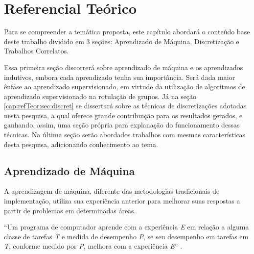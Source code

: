 \chapter{Referencial Teórico}\label{cap:refTeor}


Para se compreender a temática proposta, este capítulo abordará o conteúdo base deste trabalho dividido em 3 seções: Aprendizado de Máquina, Discretização e Trabalhos Correlatos. 

Essa primeira seção discorrerá sobre aprendizado de máquina e os aprendizados indutivos, embora cada aprendizado tenha sua importância. Será dada maior ênfase ao aprendizado supervisionado, em virtude da utilização de algoritmos de aprendizado supervisionado na rotulação de grupos. Já na seção  \ref{cap:refTeor:sec:discret} se dissertará sobre as técnicas de discretizações adotadas nesta pesquisa, a qual oferece grande contribuição para os resultados gerados, e ganhando, assim, uma seção própria para explanação do funcionamento dessas técnicas. Na última seção serão abordados trabalhos com mesmas características desta pesquisa, adicionando conhecimento ao tema. 



\section{Aprendizado de Máquina}\label{cap:refTeor:sec:aprendMaq}

A aprendizagem de máquina, diferente das metodologias tradicionais de implementação, utiliza sua experiência anterior para melhorar suas respostas a partir de problemas em determinadas áreas. 
 
 ``Um programa de computador aprende com a experiência \textit{E} em relação a alguma classe de tarefas \textit{T} e medida de desempenho \textit{P}, se seu desempenho em tarefas em \textit{T}, conforme medido por \textit{P}, melhora com a experiência \textit{E}'' \cite[p. 2]{Mitchell1997}. 
 
 

